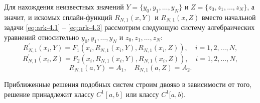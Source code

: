 Для нахождения неизвестных значений $Y=\{y_0,y_1, \dots,y_N\}$ и
$Z=\{z_0,z_1, \dots, z_N\}$, а значит, и искомых сплайн-функций $R_{N,1}(x,Y)$
 и $R_{N,1}(x,Z)$  вместо начальной задачи \eqref{eq:ark-4.1} -- \eqref{eq:ark-4.3}
 рассмотрим следующую систему алгебраических уравнений относительно
 $y_0,y_1, \dots,y_N$ и $z_0,z_1, \dots, z_N$:
$$
R_{N,1}^\prime(x_i,Y)=F_1(x_i, R_{N,1}(x_i,Y),R_{N,1}(x_i,Z)),\quad i=1,2,\dots,N,
$$
$$
R_{N,1}^\prime(x_i,Z)=F_2(x_i, R_{N,1}(x_i,Y),R_{N,1}(x_i,Z)),\quad i=1,2,\dots,N,
$$
$$
R_{N,1}(a,Y)=A_1,\quad R_{N,1}(a,Z)=A_2.
$$

Приближенные решения подобных систем строим двояко в зависимости от того, решение
принадлежит классу $C^1[a,b]$  или классу $C^1[a,b)$.






















